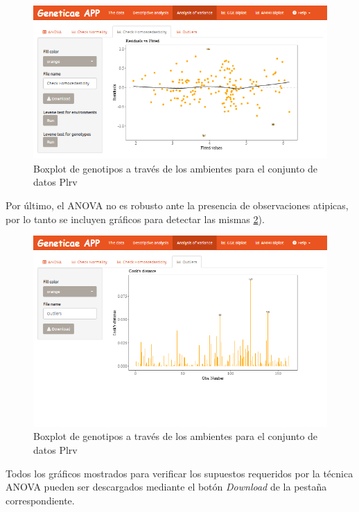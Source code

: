 \begin{figure}[H]
	\begin{center}
		\includegraphics[width=16cm]{./Graficos/Homocedasticidad.png}
	\end{center}
	\caption{Boxplot de genotipos a través de los ambientes para el conjunto de datos Plrv}
	\label{fig:fig4310}
\end{figure}

Por último, el ANOVA no es robusto ante la presencia de observaciones atipicas, por lo tanto se incluyen gráficos para detectar las mismas \ref{fig:fig4311}).

\begin{figure}[H]
	\begin{center}
		\includegraphics[width=16cm]{./Graficos/Outliers.png}
	\end{center}
	\caption{Boxplot de genotipos a través de los ambientes para el conjunto de datos Plrv}
	\label{fig:fig4311}
\end{figure}

Todos los gráficos mostrados para verificar los supuestos requeridos por la técnica ANOVA pueden ser descargados mediante el botón \emph{Download} de la pestaña correspondiente.

